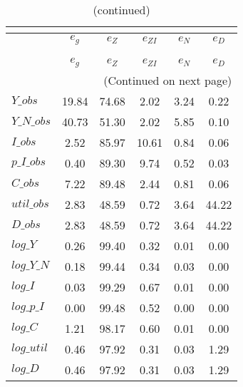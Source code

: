  
\begin{center}
\begin{longtable}{lccccc} 
\caption{VARIANCE DECOMPOSITION (in percent)}\\
 \label{Table:th_var_decomp_uncond}\\
\toprule 
$           $	 & 	 $       {e_g}$	 & 	 $       {e_Z}$	 & 	 $    {e_{ZI}}$	 & 	 $       {e_N}$	 & 	 $       {e_D}$\\
\midrule \endfirsthead 
\caption{(continued)}\\
 \toprule \\ 
$           $	 & 	 $       {e_g}$	 & 	 $       {e_Z}$	 & 	 $    {e_{ZI}}$	 & 	 $       {e_N}$	 & 	 $       {e_D}$\\
\midrule \endhead 
\midrule \multicolumn{6}{r}{(Continued on next page)} \\ \bottomrule \endfoot 
\bottomrule \endlastfoot 
$Y\_obs     $	 & 	       19.84	 & 	       74.68	 & 	        2.02	 & 	        3.24	 & 	        0.22 \\ 
$Y\_N\_obs  $	 & 	       40.73	 & 	       51.30	 & 	        2.02	 & 	        5.85	 & 	        0.10 \\ 
$I\_obs     $	 & 	        2.52	 & 	       85.97	 & 	       10.61	 & 	        0.84	 & 	        0.06 \\ 
$p\_I\_obs  $	 & 	        0.40	 & 	       89.30	 & 	        9.74	 & 	        0.52	 & 	        0.03 \\ 
$C\_obs     $	 & 	        7.22	 & 	       89.48	 & 	        2.44	 & 	        0.81	 & 	        0.06 \\ 
$util\_obs  $	 & 	        2.83	 & 	       48.59	 & 	        0.72	 & 	        3.64	 & 	       44.22 \\ 
$D\_obs     $	 & 	        2.83	 & 	       48.59	 & 	        0.72	 & 	        3.64	 & 	       44.22 \\ 
$log\_Y     $	 & 	        0.26	 & 	       99.40	 & 	        0.32	 & 	        0.01	 & 	        0.00 \\ 
$log\_Y\_N  $	 & 	        0.18	 & 	       99.44	 & 	        0.34	 & 	        0.03	 & 	        0.00 \\ 
$log\_I     $	 & 	        0.03	 & 	       99.29	 & 	        0.67	 & 	        0.01	 & 	        0.00 \\ 
$log\_p\_I  $	 & 	        0.00	 & 	       99.48	 & 	        0.52	 & 	        0.00	 & 	        0.00 \\ 
$log\_C     $	 & 	        1.21	 & 	       98.17	 & 	        0.60	 & 	        0.01	 & 	        0.00 \\ 
$log\_util  $	 & 	        0.46	 & 	       97.92	 & 	        0.31	 & 	        0.03	 & 	        1.29 \\ 
$log\_D     $	 & 	        0.46	 & 	       97.92	 & 	        0.31	 & 	        0.03	 & 	        1.29 \\ 
\end{longtable}
 \end{center}
